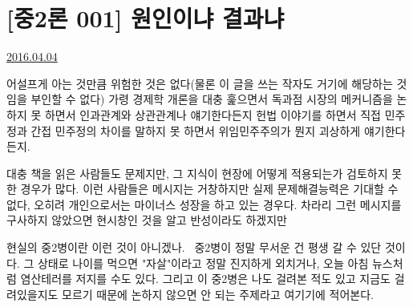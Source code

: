
\section{[중2론 001] 원인이냐 결과냐}
\href{https://www.kockoc.com/Apoc/710622}{2016.04.04}

\vspace{5mm}

어설프게 아는 것만큼 위험한 것은 없다(물론 이 글을 쓰는 작자도 거기에 해당하는 것임을 부인할 수 없다)
가령 경제학 개론을 대충 훑으면서 독과점 시장의 메커니즘을 논하지 못 하면서 인과관계와 상관관계나 얘기한다든지
헌법 이야기를 하면서 직접 민주정과 간접 민주정의 차이를 말하지 못 하면서 위임민주주의가 뭔지 괴상하게 얘기한다든지.
\vspace{5mm}

대충 책을 읽은 사람들도 문제지만, 그 지식이 현장에 어떻게 적용되는가 검토하지 못 한 경우가 많다.
이런 사람들은 메시지는 거창하지만 실제 문제해결능력은 기대할 수 없다, 오히려 개인으로서는 마이너스 성장을 하고 있는 경우다.
차라리 그런 메시지를 구사하지 않았으면 현시창인 것을 알고 반성이라도 하겠지만
\vspace{5mm}

현실의 중2병이란 이런 것이 아니겠나.  중2병이 정말 무서운 건 평생 갈 수 있단 것이다.
그 상태로 나이를 먹으면 "자살"이라고 정말 진지하게 외치거나, 오늘 아침 뉴스처럼 염산테러를 저지를 수도 있다.
그리고 이 중2병은 나도 걸려본 적도 있고 지금도 걸려있을지도 모르기 때문에 논하지 않으면 안 되는 주제라고 여기기에 적어본다.
\vspace{5mm}

